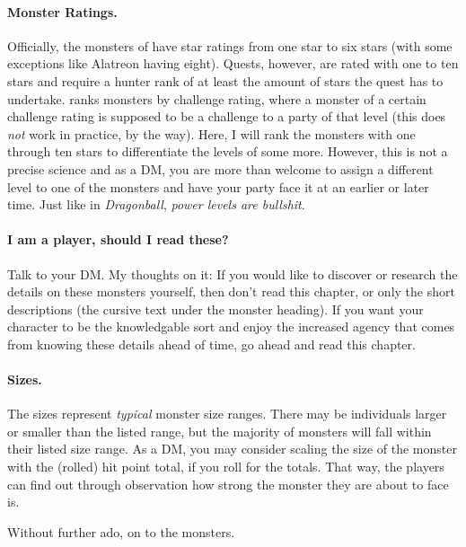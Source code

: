 \paragraph{Monster Ratings.} Officially, the monsters of \MH{} have star ratings from one star to six stars (with some exceptions like Alatreon having eight). Quests, however, are rated with one to ten stars and require a hunter rank of at least the amount of stars the quest has to undertake. \DND{} ranks monsters by challenge rating, where a monster of a certain challenge rating is supposed to be a challenge to a party of that level (this does \emph{not} work in practice, by the way). Here, I will rank the monsters with one through ten stars to differentiate the levels of \MH{} some more. However, this is not a precise science and as a DM, you are more than welcome to assign a different level to one of the monsters and have your party face it at an earlier or later time. Just like in \emph{Dragonball}, \emph{power levels are bullshit}.

\paragraph{I am a player, should I read these?} Talk to your DM. My thoughts on it: If you would like to discover or research the details on these monsters yourself, then don't read this chapter, or only the short descriptions (the cursive text under the monster heading). If you want your character to be the knowledgable sort and enjoy the increased agency that comes from knowing these details ahead of time, go ahead and read this chapter.

\paragraph{Sizes.} The sizes represent \emph{typical} monster size ranges. There may be individuals larger or smaller than the listed range, but the majority of monsters will fall within their listed size range. As a DM, you may consider scaling the size of the monster with the (rolled) hit point total, if you roll for the totals. That way, the players can find out through observation how strong the monster they are about to face is.

Without further ado, on to the monsters.

\let\svaddcontentsline\addcontentsline
\renewcommand\addcontentsline[3]{%
  \ifthenelse{\equal{#1}{lof}}{}%
  {\ifthenelse{\equal{#1}{lot}}{}{\svaddcontentsline{#1}{#2}{#3}}}}

